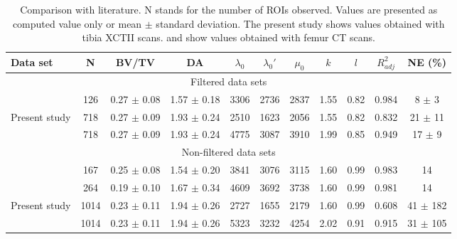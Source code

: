 \documentclass[a4paper,fleqn]{DC_ArtStyle}
\begin{document}
\begin{table*}[b]
	\caption{Comparison with literature. N stands for the number of ROIs observed. Values are presented as computed value only or mean $\pm$ standard deviation. The present study shows values obtained with tibia XCTII scans. \citeauthor{Panyasantisuk2015} \cite{Panyasantisuk2015} and \citeauthor{Gross2013} \cite{Gross2013} show values obtained with femur \si{\micro}CT scans.}
	\label{Table4}
	\begin{tabular}{lcccccccccc}
		\toprule
		Data set & N & BV/TV & DA & $\lambda_0$ & $\lambda_0'$ & $\mu_0$ & $k$ & $l$ & $R^2_{adj}$ & NE (\%) \\
		\midrule
		\multicolumn{11}{c}{\cellcolor[HTML]{D9D9D9}Filtered data sets}\\
		
		\citeauthor{Panyasantisuk2015} \cite{Panyasantisuk2015} & 126 & 0.27 $\pm$ 0.08 & 1.57 $\pm$ 0.18 & 3306 & 2736 & 2837 & 1.55 & 0.82 & 0.984 & 8 $\pm$ 3\\
		
		\multirow{2}{*}{Present study} & 718 & 0.27 $\pm$ 0.09 & 1.93 $\pm$ 0.24 & 2510 & 1623 & 2056 & 1.55 & 0.82 & 0.832 & 21 $\pm$ 11\\
		& 718 & 0.27 $\pm$ 0.09 & 1.93 $\pm$ 0.24 & 4775 & 3087 & 3910 & 1.99 & 0.85 & 0.949 & 17 $\pm$ 9\\[1ex]
		
		\multicolumn{11}{c}{\cellcolor[HTML]{D9D9D9}Non-filtered data sets}\\
		\citeauthor{Panyasantisuk2015} \cite{Panyasantisuk2015} & 167 & 0.25 $\pm$ 0.08 & 1.54 $\pm$ 0.20 & 3841 & 3076 & 3115 & 1.60 & 0.99 & 0.983 & 14\\
		
		\citeauthor{Gross2013} \cite{Gross2013} & 264 & 0.19 $\pm$ 0.10 & 1.67 $\pm$ 0.34 & 4609 & 3692 & 3738 & 1.60 & 0.99 & 0.981 & 14\\
		
		\multirow{2}{*}{Present study} & 1014 & 0.23 $\pm$ 0.11 & 1.94 $\pm$ 0.26 & 2727 & 1655 & 2179 & 1.60 & 0.99 & 0.608 & 41 $\pm$ 182\\
		& 1014 & 0.23 $\pm$ 0.11 & 1.94 $\pm$ 0.26 & 5323 & 3232 & 4254 & 2.02 & 0.91 & 0.915 & 31 $\pm$ 105\\
		\bottomrule
	\end{tabular}
\end{table*}
\end{document}
